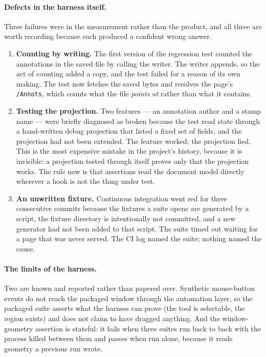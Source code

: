 \paragraph{Defects in the harness itself.} Three failures were in the measurement rather than
the product, and all three are worth recording because each produced a confident wrong answer.

\begin{enumerate}
  \item \textbf{Counting by writing.} The first version of the regression test counted the
        annotations in the saved file by calling the writer. The writer appends, so the act of
        counting added a copy, and the test failed for a reason of its own making. The test now
        fetches the saved bytes and resolves the page's \texttt{/Annots}, which counts what the
        file \emph{points at} rather than what it contains.
  \item \textbf{Testing the projection.} Two features --- an annotation author and a stamp name
        --- were briefly diagnosed as broken because the test read state through a hand-written
        debug projection that listed a fixed set of fields, and the projection had not been
        extended. The feature worked; the projection lied. This is the most expensive mistake
        in the project's history, because it is invisible: a projection tested through itself
        proves only that the projection works. The rule now is that assertions read the
        document model directly wherever a hook is not the thing under test.
  \item \textbf{An unwritten fixture.} Continuous integration went red for three consecutive
        commits because the fixtures a suite opens are generated by a script, the fixture
        directory is intentionally not committed, and a new generator had not been added to
        that script. The suite timed out waiting for a page that was never served. The CI log
        named the suite; nothing named the cause.
\end{enumerate}

\paragraph{The limits of the harness.} Two are known and reported rather than papered over.
Synthetic mouse-button events do not reach the packaged window through the automation layer, so
the packaged suite asserts what the harness can prove (the tool is selectable, the region
exists) and does not claim to have dragged anything. And the window-geometry assertion is
stateful: it fails when three suites run back to back with the process killed between them and
passes when run alone, because it reads geometry a previous run wrote.

